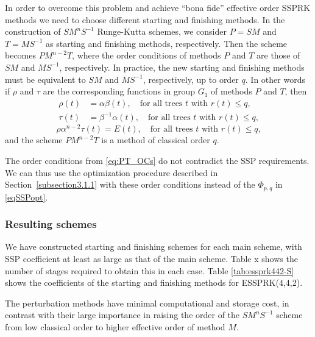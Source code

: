 
In order to overcome this problem and achieve ``bona fide'' effective order SSPRK methods we need to choose different starting and finishing methods. In the construction of \( SM^{n}S^{-1} \) Runge-Kutta schemes, we consider \( P = SM \) and \( T = MS^{-1} \) as starting and finishing methods, respectively. Then the scheme becomes \( PM^{n-2}T \), where the order conditions of methods \( P \) and \( T \) are those of \( SM \) and \( MS^{-1} \), respectively.
In practice, the new starting and finishing methods must be equivalent to \( SM \) and \( MS^{-1} \), respectively, up to order $q$.
 In other words if \( \rho \) and \( \tau \) are the corresponding functions in group $G_1$ of methods \( P \) and \( T \), then
\begin{subequations} \label{eq:PT_OCs}
\begin{align}
    \rho(t) &= \alpha\beta(t), \quad \text{for all trees $t$ with $r(t) \leq q$,} \\
    \tau(t) &= \beta^{-1}\alpha(t), \quad \text{for all trees $t$ with $r(t) \leq q$,}
\end{align}
\end{subequations}
$$
    \rho\alpha^{n-2}\tau(t) = E(t), \quad \text{for all trees $t$ with $r(t) \leq q$,}
$$
and the scheme \( PM^{n-2}T \) is a method of classical order \( q \).

The order conditions from \eqref{eq:PT_OCs} do not contradict the SSP
requirements.  We can thus use the optimization procedure described in
Section~\ref{subsection3.1.1} with these order conditions instead of
the $\Phi_{p,q}$ in \eqref{eqSSPopt}. 

\subsubsection{Resulting schemes}
We have constructed starting and finishing schemes for each main scheme,
with SSP coefficient at least as large as that of the main scheme.
Table x shows the number of stages required to obtain this in each case.
Table \ref{tab:essprk442-S} shows the coefficients of the starting and finishing methods for 
ESSPRK(4,4,2).

The perturbation methods have minimal computational and storage cost, in
contrast with their large importance in raising the order of the \(
SM^{n}S^{-1} \) scheme from low classical order to higher effective order of
method \( M \).

